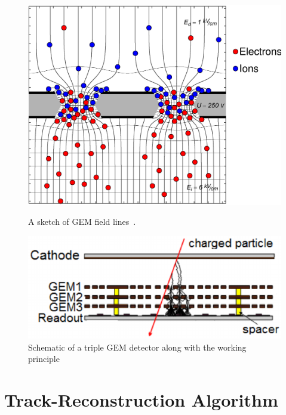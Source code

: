  \begin{figure}[t!]
 \centering
   \begin{minipage}[t]{.45\textwidth}
     \centering
     \includegraphics[width=\linewidth]{thesis_figures/GEM_field.png}

     \caption{A sketch of GEM field lines~\cite{GEM_field}.}
     \label{fig:GEM_field}
   \end{minipage}
   \hfill
   \begin{minipage}[t]{.45\textwidth}
     \centering
     \includegraphics[width=\linewidth]{thesis_figures/GEM_process.png}
     \caption{Schematic of a triple GEM detector along with the working principle~\cite{article_GEM_pic}}
     \label{fig:Triple_GEM}
   \end{minipage}
 \end{figure}

\section{Track-Reconstruction Algorithm}

